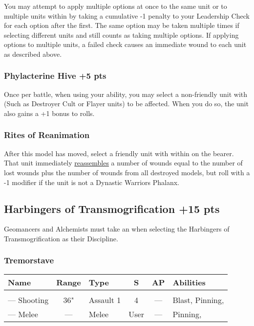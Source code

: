 You may attempt to apply multiple options at once to the same unit or to multiple units within  by taking a cumulative -1 penalty to your Leadership Check for each option after the first. The same option may be taken multiple times if selecting different units and still counts as taking multiple options. If applying options to multiple units, a failed check causes an immediate wound to each unit as described above.

\subsubsection[Phylacterine Hive ]{Phylacterine Hive  \hrulefill +5 pts}

Once per battle, when using your  ability, you may select a non-friendly unit with  (Such as Destroyer Cult or Flayer units) to be affected. When you do so, the unit also gains a +1 bonus to  rolls.

\subsubsection{Rites of Reanimation} \label{Rites of Reanimation}

After this model has moved, select a friendly unit with  within  on the bearer. That unit immediately \textcolor{violet}{\hyperref[Reanimation Protocols]{reassembles}} a number of wounds equal to the number of lost wounds plus the number of wounds from all destroyed models, but roll with a -1 modifier if the unit is not a Dynastic Warriors Phalanx.



\subsection[Harbingers of Transmogrification ]{Harbingers of Transmogrification  \hrulefill +15 pts}

Geomancers and Alchemists must take an  when selecting the Harbingers of Transmogrification as their Discipline.

\subsubsection{Tremorstave}
\label{Tremorstave}
\noindent
\begin{NiceTabular}{L{115 pt} c C{40pt} *{2}{c} >{\raggedright\arraybackslash}p{240pt}}
	Name & Range & Type & S & AP & Abilities \\
	\hline
	 &  &  &  &  & \\
	— Shooting & 36" & Assault 1 & 4 & — & Blast, Pinning,   \\
	— Melee & — & Melee & User & — & Pinning,  \\
\end{NiceTabular}

